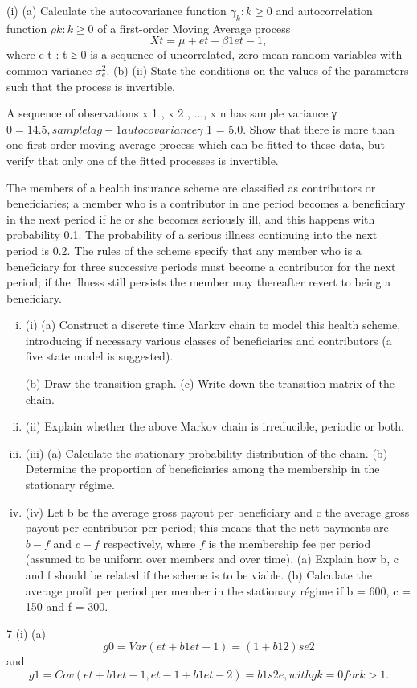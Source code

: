 \documentclass[a4paper,12pt]{article}
\begin{document}
\begin{enumerate}
(i)
(a)
Calculate the autocovariance function ${\gamma_k  : k\geq  0}$ and autocorrelation function ${ρ k : k \geq 0}$ of a first-order Moving
Average process
\[X t = μ + e t + β 1 e t−1 ,\]
where {e t : t ≥ 0} is a sequence of uncorrelated, zero-mean random
variables with common variance $\sigma^2_e$.
(b)
(ii)
State the conditions on the values of the parameters such that the process is invertible.

A sequence of observations x 1 , x 2 , ..., x n has sample variance γ $ 0 = 14.5, sample lag-1 autocovariance γ $ 1 = 5.0. Show that there is more than one first-order moving average process which can be fitted to these data, but verify that only one of the fitted processes is invertible.

The members of a health insurance scheme are classified as contributors or beneficiaries; a member who is a contributor in one period becomes a beneficiary in the next period if he or she becomes seriously ill, and this happens with probability 0.1. The probability of a serious illness continuing into the next period is 0.2. The rules of the scheme specify that any member
who is a beneficiary for three successive periods must become a contributor for the next period; if the illness still persists the member may thereafter revert to being a beneficiary.
\begin{enumerate}[(i)]
\item (i)
(a) Construct a discrete time Markov chain to model this health scheme, introducing if necessary various classes of beneficiaries
and contributors (a five state model is suggested).

(b) Draw the transition graph.
(c) Write down the transition matrix of the chain.
\item (ii) Explain whether the above Markov chain is irreducible, periodic or both.

\item (iii) (a)
Calculate the stationary probability distribution of the chain.
(b)
Determine the proportion of beneficiaries among the membership in the stationary régime.
\item (iv)
Let b be the average gross payout per beneficiary and c the average gross payout per contributor per period; this means that the nett
payments are $b − f$ and $c − f$ respectively, where $f$ is the membership fee per period (assumed to be uniform over members and over time).
(a) Explain how b, c and f should be related if the scheme is to be viable.
(b) Calculate the average profit per period per member in the stationary régime if b = 600, c = 150 and f = 300.
\end{enumerate}
7
(i)
(a)
\[g 0 = Var(e t + b 1 e t-1 ) = ( 1 + b 12 ) s e 2 \]and 
\[g 1 = Cov(e t + b 1 e t-1 , e t-1 + b 1 e t-2 )
= b 1 s 2 e , with g k = 0 for k > 1.\]


\end{enumerate}
\end{document}
